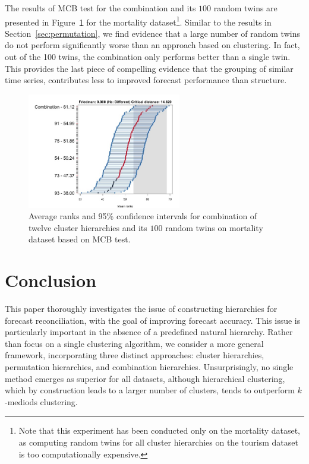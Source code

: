 \documentclass[a4paper,review,12pt,authoryear]{elsarticle}
\begin{document}
The results of MCB test for the combination and its $100$ random twins are presented in Figure~\ref{fig:P4_a_vs_pa} for the mortality dataset\footnote{Note that this experiment has been conducted only on the mortality dataset, as computing random twins for all cluster hierarchies on the tourism dataset is too computationally expensive.}.
Similar to the results in Section~\ref{sec:permutation}, we find evidence that a large number of random twins do not perform significantly worse than an approach based on clustering. In fact, out of the 100 twins, the combination only performs better than a single twin. This provides the last piece of compelling evidence that the grouping of similar time series, contributes less to improved forecast performance than structure.

\begin{figure}[h!]
    \centering
    \includegraphics[width=0.6\textwidth]{../figures/Figure13_mortality_comb_vs_pc.jpg}
    \vspace{-0.1in}\caption{\label{fig:P4_a_vs_pa} Average ranks and 95\% confidence intervals for combination of twelve cluster hierarchies and its $100$ random twins on mortality dataset based on MCB test.}
\end{figure}

\section{Conclusion}
\label{sec:conclusion}

This paper thoroughly investigates the issue of constructing hierarchies for forecast reconciliation, with the goal of improving forecast accuracy. This issue is particularly important in the absence of a predefined natural hierarchy. Rather than focus on a single clustering algorithm, we consider a more general framework, incorporating three distinct approaches: cluster hierarchies, permutation hierarchies, and combination hierarchies. Unsurprisingly, no single method emerges as superior for all datasets, although hierarchical clustering, which by construction leads to a larger number of clusters, tends to outperform $k$-mediods clustering.
\end{document}
